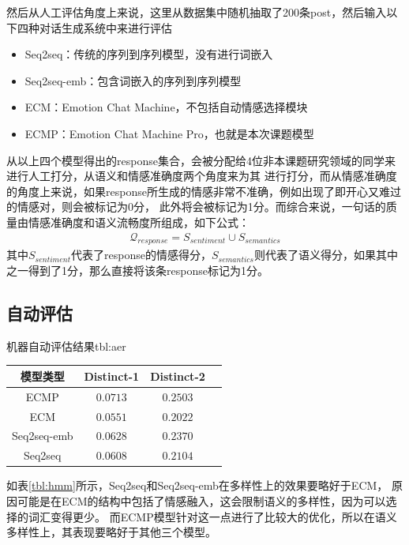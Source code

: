 \documentclass[supercite]{HustGraduPaper}
\theoremstyle{definition}
\begin{document}
然后从人工评估角度上来说，这里从数据集中随机抽取了200条post，然后输入以下四种对话生成系统中来进行评估
\begin{itemize}
  \item Seq2seq：传统的序列到序列模型，没有进行词嵌入
  \item Seq2seq-emb：包含词嵌入的序列到序列模型
  \item ECM：Emotion Chat Machine，不包括自动情感选择模块
  \item ECMP：Emotion Chat Machine Pro，也就是本次课题模型
\end{itemize}
从以上四个模型得出的response集合，会被分配给4位非本课题研究领域的同学来进行人工打分，从语义和情感准确度两个角度来为其
进行打分，而从情感准确度的角度上来说，如果response所生成的情感非常不准确，例如出现了即开心又难过的情感对，则会被标记为0分，
此外将会被标记为1分。而综合来说，一句话的质量由情感准确度和语义流畅度所组成，如下公式：
\begin{align}
  \mathcal{Q}_{response} = S_{sentiment} \cup S_{semantics} \label{5.1}
\end{align}
其中$S_{sentiment}$代表了response的情感得分，$S_{semantics}$则代表了语义得分，如果其中之一得到了1分，那么直接将该条response标记为1分。

\subsection{自动评估}
\begin{generaltab}{机器自动评估结果}{tbl:aer}
  \begin{tabular}{c|ccc}
    \toprule
    模型类型 & Distinct-1 & Distinct-2 \\
    \midrule
    ECMP & $0.0713$ & $0.2503$\\
    ECM & $0.0551$ & $0.2022$\\
    Seq2seq-emb & $0.0628$ & $0.2370$\\
    Seq2seq & $0.0608$ & $0.2104$\\
    \bottomrule
  \end{tabular}
\end{generaltab}

如表\ref{tbl:hmm}所示，Seq2seq和Seq2seq-emb在多样性上的效果要略好于ECM，
原因可能是在ECM的结构中包括了情感融入，这会限制语义的多样性，因为可以选择的词汇变得更少。
而ECMP模型针对这一点进行了比较大的优化，所以在语义多样性上，其表现要略好于其他三个模型。
\end{document}
